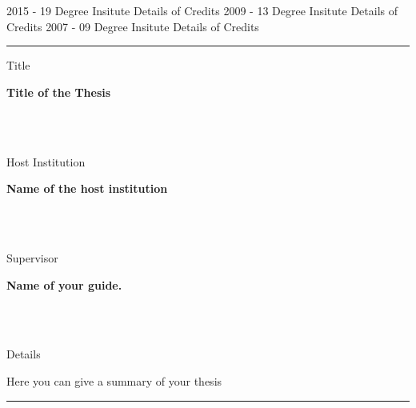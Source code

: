 \documentclass[11pt]{anirudhcv}
\begin{document}
\begin{entrylist}
	\entry
		{2015 - 19}
		{Degree}
		{Insitute}
		{Details of Credits}
	\entry
		{2009 - 13}
		{Degree}
		{Insitute}
		{Details of Credits}
	\entry
		{2007 - 09}
		{Degree}
		{Insitute}
		{Details of Credits}
\end{entrylist}


\noindent\color{black}\rule{0.81\paperwidth}{0.5ex}
\newline
{}\hfill{}

   	\parbox[t]{0.175\textwidth}{Title}\parbox[t]{0.825\textwidth}{{\large{\textbf{Title of the Thesis}}}}\\\\
   	\parbox[t]{0.175\textwidth}{Host Institution}\parbox[t]{0.825\textwidth}{{\large{\textbf{Name of the host institution}}}}\\\\
   	\parbox[t]{0.175\textwidth}{Supervisor}\parbox[t]{0.825\textwidth}{{\large{\textbf{Name of your guide.}}}}\\\\
    \parbox[t]{0.175\textwidth}{Details}\parbox[t]{0.825\textwidth}{{\large{Here you can give a summary of your thesis}}}

\noindent\color{black}\rule{0.81\paperwidth}{0.5ex}
\newline
{}\hfill{}
\end{document}
